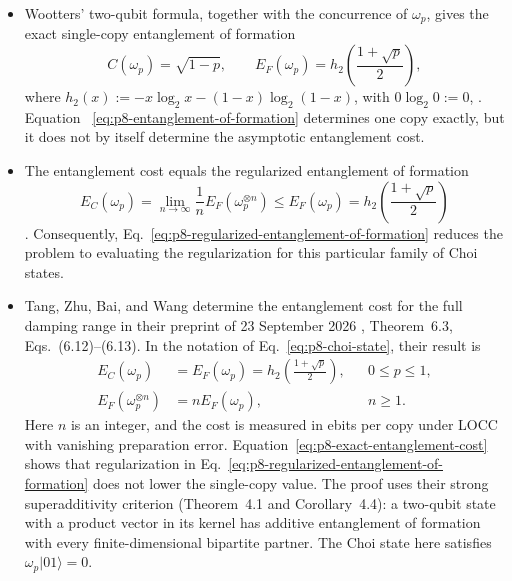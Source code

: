 \begin{itemize}
  \item Wootters' two-qubit formula, together with the concurrence of
  $\omega_p$, gives the exact single-copy entanglement of formation
  \begin{equation}
    C(\omega_p)=\sqrt{1-p},
    \qquad
    E_F(\omega_p)=h_2\!\left(\frac{1+\sqrt p}{2}\right),
    \label{eq:p8-entanglement-of-formation}
  \end{equation}
  where $h_2(x):=-x\log_2x-(1-x)\log_2(1-x)$, with $0\log_2 0:=0$,
  .  Equation~
  \eqref{eq:p8-entanglement-of-formation} determines one copy exactly, but it
  does not by itself determine the asymptotic entanglement cost.

  \item The entanglement cost equals the regularized entanglement of formation
  \begin{equation}
    E_C(\omega_p)
      =\lim_{n\to\infty}\frac1n E_F(\omega_p^{\otimes n})
      \le E_F(\omega_p)
      =h_2\!\left(\frac{1+\sqrt p}{2}\right)
    \label{eq:p8-regularized-entanglement-of-formation}
  \end{equation}
  .  Consequently,
  Eq.~\eqref{eq:p8-regularized-entanglement-of-formation} reduces the problem
  to evaluating the regularization for this particular family of Choi
  states.

  \item Tang, Zhu, Bai, and Wang determine the entanglement cost for the full
  damping range in their preprint of 23 September 2026
  , Theorem~6.3,
  Eqs.~(6.12)--(6.13).  In the notation of Eq.~\eqref{eq:p8-choi-state},
  their result is
  \begin{equation}
    \begin{aligned}
      E_C(\omega_p)&=E_F(\omega_p)
        =h_2\!\left(\frac{1+\sqrt p}{2}\right),
        &&0\le p\le1,\\
      E_F(\omega_p^{\otimes n})&=nE_F(\omega_p),
        &&n\ge1.
    \end{aligned}
    \label{eq:p8-exact-entanglement-cost}
  \end{equation}
  Here $n$ is an integer, and the cost is measured in ebits per copy under
  LOCC with vanishing preparation error.  Equation~\eqref{eq:p8-exact-entanglement-cost}
  shows that regularization in Eq.~\eqref{eq:p8-regularized-entanglement-of-formation}
  does not lower the single-copy value.  The proof uses their strong
  superadditivity criterion (Theorem~4.1 and Corollary~4.4): a two-qubit
  state with a product vector in its kernel has additive entanglement of
  formation with every finite-dimensional bipartite partner.  The Choi
  state here satisfies $\omega_p\lvert01\rangle=0$.
\end{itemize}

